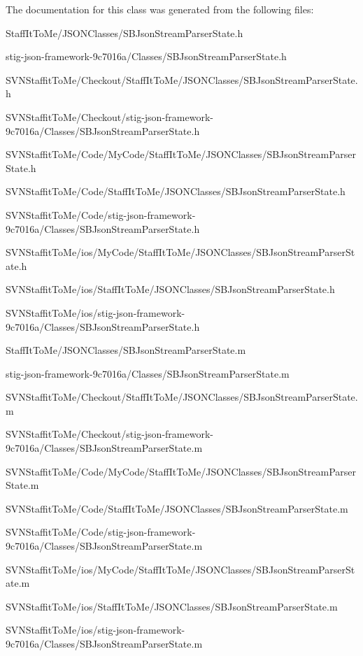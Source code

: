 \-The documentation for this class was generated from the following files\-:\begin{DoxyCompactItemize}
\item 
\-Staff\-It\-To\-Me/\-J\-S\-O\-N\-Classes/\-S\-B\-Json\-Stream\-Parser\-State.\-h\item 
stig-\/json-\/framework-\/9c7016a/\-Classes/\-S\-B\-Json\-Stream\-Parser\-State.\-h\item 
\-S\-V\-N\-Staffit\-To\-Me/\-Checkout/\-Staff\-It\-To\-Me/\-J\-S\-O\-N\-Classes/\-S\-B\-Json\-Stream\-Parser\-State.\-h\item 
\-S\-V\-N\-Staffit\-To\-Me/\-Checkout/stig-\/json-\/framework-\/9c7016a/\-Classes/\-S\-B\-Json\-Stream\-Parser\-State.\-h\item 
\-S\-V\-N\-Staffit\-To\-Me/\-Code/\-My\-Code/\-Staff\-It\-To\-Me/\-J\-S\-O\-N\-Classes/\-S\-B\-Json\-Stream\-Parser\-State.\-h\item 
\-S\-V\-N\-Staffit\-To\-Me/\-Code/\-Staff\-It\-To\-Me/\-J\-S\-O\-N\-Classes/\-S\-B\-Json\-Stream\-Parser\-State.\-h\item 
\-S\-V\-N\-Staffit\-To\-Me/\-Code/stig-\/json-\/framework-\/9c7016a/\-Classes/\-S\-B\-Json\-Stream\-Parser\-State.\-h\item 
\-S\-V\-N\-Staffit\-To\-Me/ios/\-My\-Code/\-Staff\-It\-To\-Me/\-J\-S\-O\-N\-Classes/\-S\-B\-Json\-Stream\-Parser\-State.\-h\item 
\-S\-V\-N\-Staffit\-To\-Me/ios/\-Staff\-It\-To\-Me/\-J\-S\-O\-N\-Classes/\-S\-B\-Json\-Stream\-Parser\-State.\-h\item 
\-S\-V\-N\-Staffit\-To\-Me/ios/stig-\/json-\/framework-\/9c7016a/\-Classes/\-S\-B\-Json\-Stream\-Parser\-State.\-h\item 
\-Staff\-It\-To\-Me/\-J\-S\-O\-N\-Classes/\-S\-B\-Json\-Stream\-Parser\-State.\-m\item 
stig-\/json-\/framework-\/9c7016a/\-Classes/\-S\-B\-Json\-Stream\-Parser\-State.\-m\item 
\-S\-V\-N\-Staffit\-To\-Me/\-Checkout/\-Staff\-It\-To\-Me/\-J\-S\-O\-N\-Classes/\-S\-B\-Json\-Stream\-Parser\-State.\-m\item 
\-S\-V\-N\-Staffit\-To\-Me/\-Checkout/stig-\/json-\/framework-\/9c7016a/\-Classes/\-S\-B\-Json\-Stream\-Parser\-State.\-m\item 
\-S\-V\-N\-Staffit\-To\-Me/\-Code/\-My\-Code/\-Staff\-It\-To\-Me/\-J\-S\-O\-N\-Classes/\-S\-B\-Json\-Stream\-Parser\-State.\-m\item 
\-S\-V\-N\-Staffit\-To\-Me/\-Code/\-Staff\-It\-To\-Me/\-J\-S\-O\-N\-Classes/\-S\-B\-Json\-Stream\-Parser\-State.\-m\item 
\-S\-V\-N\-Staffit\-To\-Me/\-Code/stig-\/json-\/framework-\/9c7016a/\-Classes/\-S\-B\-Json\-Stream\-Parser\-State.\-m\item 
\-S\-V\-N\-Staffit\-To\-Me/ios/\-My\-Code/\-Staff\-It\-To\-Me/\-J\-S\-O\-N\-Classes/\-S\-B\-Json\-Stream\-Parser\-State.\-m\item 
\-S\-V\-N\-Staffit\-To\-Me/ios/\-Staff\-It\-To\-Me/\-J\-S\-O\-N\-Classes/\-S\-B\-Json\-Stream\-Parser\-State.\-m\item 
\-S\-V\-N\-Staffit\-To\-Me/ios/stig-\/json-\/framework-\/9c7016a/\-Classes/\-S\-B\-Json\-Stream\-Parser\-State.\-m\end{DoxyCompactItemize}
